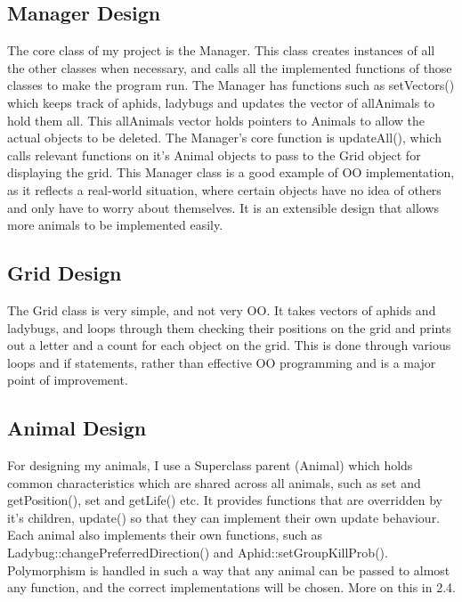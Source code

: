 \documentclass[11pt, article]{article}
\begin{document}
	\subsection{Manager Design}
	
	The core class of my project is the Manager. This class creates instances of all the other classes when necessary, and calls all the implemented functions of those classes to make the program run. The Manager has functions such as  setVectors() which keeps track of aphids, ladybugs and updates the vector of allAnimals to hold them all. This allAnimals vector holds pointers to Animals to allow the actual objects to be deleted. The Manager's core function is updateAll(), which calls relevant functions on it's Animal objects to pass to the Grid object for displaying the grid. This Manager class is a good example of OO implementation, as it reflects a real-world situation, where certain objects have no idea of others and only have to worry about themselves. It is an extensible design that allows more animals to be implemented easily.   
	
	\subsection{Grid Design}
	
	The Grid class is very simple, and not very OO. It takes vectors of aphids and ladybugs, and loops through them checking their positions on the grid and prints out a letter and a count for each object on the grid. This is done through various loops and if statements, rather than effective OO programming and is a major point of improvement.
	
	\subsection{Animal Design}
	
	For designing my animals, I use a Superclass parent (Animal) which holds common characteristics which are shared across all animals, such as set and getPosition(), set and getLife() etc. It provides functions that are overridden by it's children, update() so that they can implement their own update behaviour. Each animal also implements their own functions, such as Ladybug::changePreferredDirection() and Aphid::setGroupKillProb(). Polymorphism is handled in such a way that any animal can be passed to almost any function, and the correct implementations will be chosen. More on this in 2.4. 
	
\end{document}
